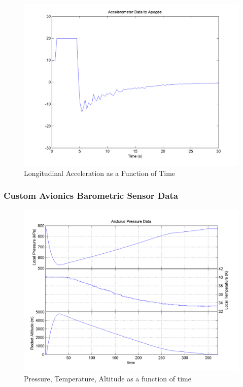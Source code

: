 \documentclass[]{article}
\begin{document}
\begin{figure}[htbp]
\centering
\includegraphics{images/plots/arcturus_accelerometer_apogee_plot.png}
\caption{Longitudinal Acceleration as a Function of Time
\label{arcturus_accelerometer_apogee_plot_label}}
\end{figure}

\clearpage

\subsubsection{Custom Avionics Barometric Sensor
Data}\label{custom-avionics-barometric-sensor-data}

\begin{figure}[htbp]
\centering
\includegraphics{images/plots/arcturus_pressure_plot.png}
\caption{Pressure, Temperature, Altitude as a function of time
\label{arcturus_pressure_plot_label}}
\end{figure}
\end{document}
